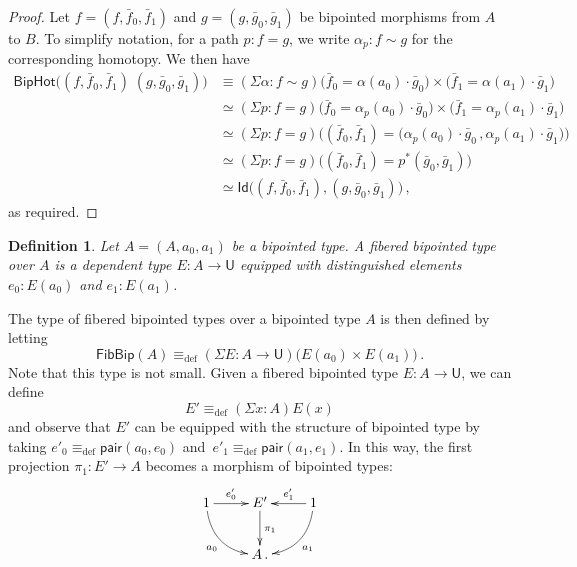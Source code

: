 \documentclass[10pt,a4paper,oneside,reqno]{amsart}
\numberwithin{equation}{section}
\theoremstyle{mythm}
\theoremstyle{mydef}
\newtheorem{definition}[theorem]{Definition}
\theoremstyle{myrmk}
\newcommand{\deq}{\equiv}
\newcommand{\defeq}{\deq_{\mathrm{def}}}
\newcommand{\co}{\colon}
\newcommand{\ct}{\cdot}
\newcommand{\pair}{\mathsf{pair}}
\newcommand{\Id}{\mathsf{Id}}
\newcommand{\UU}{\mathsf{U}}
\newcommand{\FibBip}{\mathsf{FibBip}}
\newcommand{\BipHot}{\mathsf{BipHot}}
\begin{document}
\begin{proof} Let  $f = (f, \bar{f}_0, \bar{f}_1)$ and $g = (g, \bar{g}_0, \bar{g}_1)$ be bipointed
morphisms from $A$ to $B$. To simplify notation, for a path $p \co f = g$, we write $\alpha_p \co f \sim g$
for the corresponding homotopy. We then have
\begin{align*}
\BipHot \big( (f,\bar{f}_0,\bar{f}_1) \; (g,\bar{g}_0,\bar{g}_1) \big) & \deq  
(\Sigma \alpha : f \sim g) \big(\bar{f}_0 = \alpha(a_0) \ct \bar{g}_0\big) \times \big(\bar{f}_1 = \alpha(a_1) \ct \bar{g}_1 \big) \\ 
& \simeq  (\Sigma p : f = g) \big(\bar{f}_0 = \alpha_p(a_0) \ct \bar{g}_0\big) \times \big( \bar{f}_1 = \alpha_p(a_1) \ct \bar{g}_1 \big) \\
& \simeq (\Sigma p : f = g) \big((\bar{f}_0,\bar{f}_1) = \big(\alpha_p(a_0) \ct \bar{g}_0 \, ,  \alpha_p(a_1) \ct \bar{g}_1\big) \big) \\
& \simeq (\Sigma p : f = g) \big((\bar{f}_0,\bar{f}_1) = p^{\ast} (\bar{g}_0,\bar{g}_1) \big) \\
& \simeq  \Id \big( (f,\bar{f}_0,\bar{f}_1) , (g,\bar{g}_0,\bar{g}_1)  \big) \, ,
\end{align*} 
as required.
\end{proof}





\begin{definition} \label{def:fibbipointed}
Let $A = (A, a_0, a_1)$ be a bipointed type. A \emph{fibered bipointed type} over $A$ is a dependent type
$E \co A \to \UU$ equipped with distinguished elements $e_0 \co E(a_0)$ and $e_1 \co E(a_1)$.
\end{definition}

The type of  fibered bipointed types over a bipointed type $A$ is then defined by letting
\[
\FibBip(A) \defeq (\Sigma E : A \to \UU)  \big( E(a_0) \times E(a_1) \big) \, .
 \]
 Note that this type is not small. 
Given a fibered bipointed type $E \co A \to \UU$, we can define
\[
E' \defeq (\Sigma x : A) E(x)
\] 
and observe that $E'$ can be equipped with the structure of  bipointed type by taking $e'_0 \defeq \pair(a_0, e_0)$ and~$e'_1 \defeq \pair(a_1, e_1)$.
In this way, the first projection $\pi_1 \co E' \to A$ becomes a morphism of bipointed types:
\[
\xymatrix{
1 \ar@/_1pc/[dr]_{a_0} \ar[r]^-{e'_0} & E' \ar[d]^{\pi_1} & 1 \ar[l]_-{e'_1} \ar@/^1pc/[dl]^{a_1} \\ 
 & A \, .& }
 \]
\end{document}
